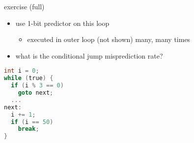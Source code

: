 \begin{frame}[fragile,label=1BmispredEx]{exercise (full)}
\begin{itemize}
\item use 1-bit predictor on this loop
    \begin{itemize}
    \item executed in outer loop (not shown) many, many times
    \end{itemize}
\item what is the conditional jump misprediction rate?
\end{itemize}
\begin{lstlisting}[language=C,style=small]
int i = 0;
while (true) {
  if (i % 3 == 0)
    goto next; 
  ...
next:
  i += 1;
  if (i == 50)
    break; 
}
\end{lstlisting}
\end{frame}

